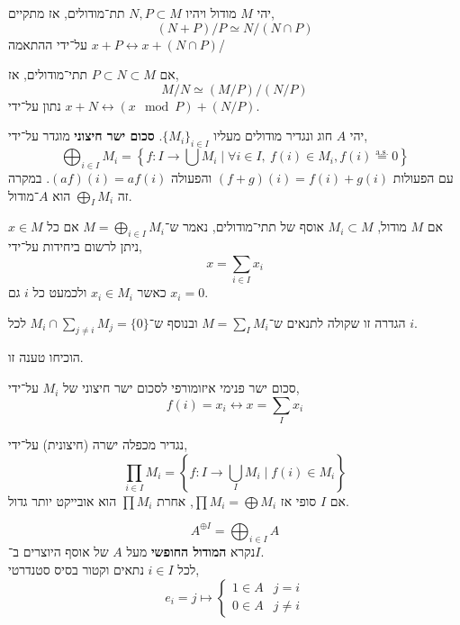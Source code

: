 \begin{theorem}
	יהי $M$ מודול ויהיו $N, P \subset M$ תת־מודולים, אז מתקיים,
	\[
		(N + P) / P
		\simeq N / (N \cap P)
	\]
	על־ידי ההתאמה $x + P \leftrightarrow x + (N \cap P)$/
\end{theorem}
\begin{theorem}
	אם $P \subset N \subset M$ תתי־מודולים, אז,
	\[
		M / N
		\simeq (M / P) / (N / P)
	\]
	נתון על־ידי $x + N \leftrightarrow (x \mod P) + (N / P)$.
\end{theorem}
\begin{definition}
	יהי $A$ חוג ונגדיר מודולים מעליו ${\{ M_i \}}_{i \in I}$.
	\textbf{סכום ישר חיצוני} מוגדר על־ידי,
	\[
		\bigoplus_{i \in I} M_i
		= \left\{ f : I \to \bigcup M_i \mid \forall i \in I,\ f(i) \in M_i, f(i) \overset{\text{a.s.}}{=} 0 \right\}
	\]
	עם הפעולות $(f + g)(i) = f(i) + g(i)$ והפעולה $(a f)(i) = a f(i)$.
	במקרה זה $\bigoplus_I M_i$ הוא $A$־מודול.
\end{definition}
\begin{definition}
	אם $M$ מודול, $M_i \subset M$ אוסף של תתי־מודולים, נאמר ש־$M = \bigoplus_{i \in I} M_i$ אם כל $x \in M$ ניתן לרשום ביחידות על־ידי,
	\[
		x
		= \sum_{i \in I} x_i
	\]
	כאשר $x_i \in M_i$ ולכמעט כל $i$ גם $x_i = 0$.
\end{definition}
\begin{proposition}
	הגדרה זו שקולה לתנאים ש־$M = \sum_I M_i$ ובנוסף ש־$M_i \cap \sum_{j \ne i} M_j = \{ 0 \}$ לכל $i$.
\end{proposition}
\begin{exercise}
	הוכיחו טענה זו.
\end{exercise}
סכום ישר פנימי איזומורפי לסכום ישר חיצוני של $M_i$ על־ידי,
\[
	f(i) = x_i
	\leftrightarrow
	x = \sum_I x_i
\]
\begin{definition}
	נגדיר מכפלה ישרה (חיצונית) על־ידי,
	\[
		\prod_{i \in I} M_i
		= \left\{ f : I \to \bigcup_I M_i \mid f(i) \in M_i \right\}
	\]
	אם $I$ סופי אז $\prod M_i = \bigoplus M_i$, אחרת $\prod M_i$ הוא אובייקט יותר גדול.
\end{definition}
\begin{definition}
	\[
		A^{\oplus I}
		= \bigoplus_{i \in I} A
	\]
	נקרא \textbf{המודול החופשי} מעל $A$ של אוסף היוצרים ב־$I$. \\
	לכל $i \in I$ נתאים וקטור בסיס סטנדרטי,
	\[
		e_i
		= j \mapsto
		\begin{cases}
			1 \in A & j = i \\
			0 \in A & j \ne i
		\end{cases}
	\]
\end{definition}
